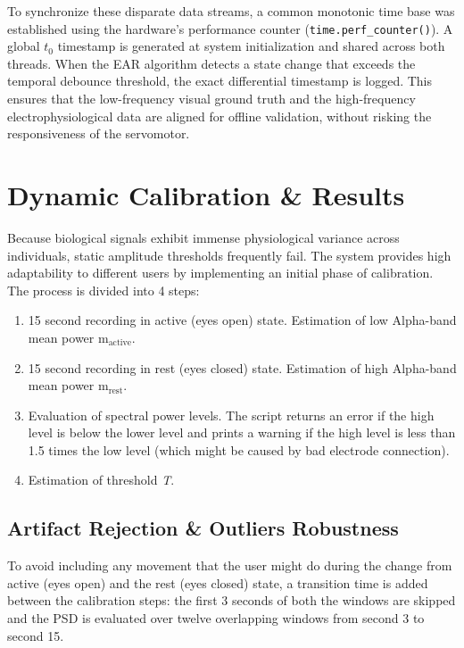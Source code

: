 \documentclass[journal, a4paper]{IEEEtran}
\begin{document}
To synchronize these disparate data streams, a common monotonic time base was established using the hardware's performance counter (\texttt{time.perf\_counter()}). A global $t_0$ timestamp is generated at system initialization and shared across both threads. When the EAR algorithm detects a state change that exceeds the temporal debounce threshold, the exact differential timestamp is logged. This ensures that the low-frequency visual ground truth and the high-frequency electrophysiological data are aligned for offline validation, without risking the responsiveness of the servomotor.

\section{Dynamic Calibration \& Results}
Because biological signals exhibit immense physiological variance across individuals, static amplitude thresholds frequently fail. The system provides high adaptability to different users by implementing an initial phase of calibration. The process is divided into 4 steps:
\begin{enumerate}
    \item 15 second recording in active (eyes open) state. Estimation of low Alpha-band mean power $\text{m}_{\text{active}}$.
    \item 15 second recording in rest (eyes closed) state. Estimation of high Alpha-band mean power $\text{m}_{\text{rest}}$.
    \item Evaluation of spectral power levels. The script returns an error if the high level is below the lower level and prints a warning if the high level is less than 1.5 times the low level (which might be caused by bad electrode connection).
    \item Estimation of threshold \textit{T}.
\end{enumerate}

\subsection{Artifact Rejection \& Outliers Robustness}
\label{rejection logic}
To avoid including any movement that the user might do during the change from  active (eyes open) and the rest (eyes closed) state, a transition time is added between the calibration steps: the first 3 seconds of both the windows are skipped and the PSD is evaluated over twelve overlapping windows from second 3 to second 15.
\end{document}
